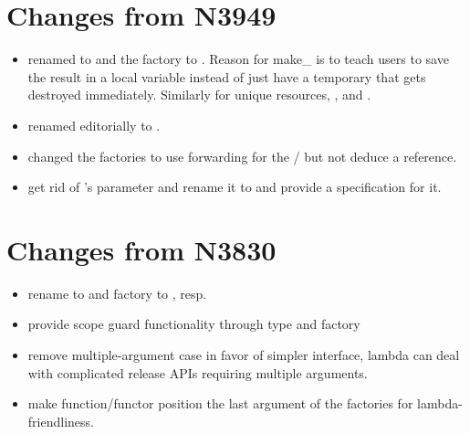 \documentclass[ebook,11pt,article]{memoir}
\begin{document}

\section{Changes from N3949}
\begin{itemize}
\item renamed  to  and the factory to . Reason for make_ is to teach users to save the result in a local variable instead of just have a temporary that gets destroyed immediately. Similarly for unique resources, ,  and .
\item renamed editorially  to .
\item changed the factories to use forwarding for the / but not deduce a reference.
\item get rid of 's parameter and rename it to  and provide a  specification for it.
\end{itemize}


\section{Changes from N3830}
\begin{itemize}
\item rename to  and factory to , resp. 
\item provide scope guard functionality through type  and  factory
\item remove multiple-argument case in favor of simpler interface, lambda can deal with complicated release APIs requiring multiple arguments.
\item make function/functor position the last argument of the factories for lambda-friendliness.

\end{itemize}
\end{document}
